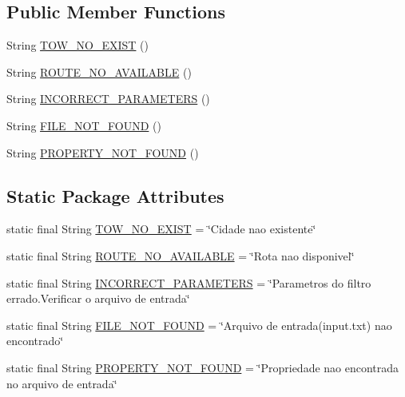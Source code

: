\subsection*{Public Member Functions}
\begin{DoxyCompactItemize}
\item 
String \hyperlink{classtranslate_1_1_pt_b_r_aa32cbf8602c41b8c6d61f19bc6c167dc}{T\+O\+W\+\_\+\+N\+O\+\_\+\+E\+X\+I\+ST} ()
\item 
String \hyperlink{classtranslate_1_1_pt_b_r_a218e01c1590aa220f2c260639080cca2}{R\+O\+U\+T\+E\+\_\+\+N\+O\+\_\+\+A\+V\+A\+I\+L\+A\+B\+LE} ()
\item 
String \hyperlink{classtranslate_1_1_pt_b_r_adaf7225439d23bc30ffd45644c9142b8}{I\+N\+C\+O\+R\+R\+E\+C\+T\+\_\+\+P\+A\+R\+A\+M\+E\+T\+E\+RS} ()
\item 
String \hyperlink{classtranslate_1_1_pt_b_r_a85f5cfc4ae5d12f192f3e513c7666455}{F\+I\+L\+E\+\_\+\+N\+O\+T\+\_\+\+F\+O\+U\+ND} ()
\item 
String \hyperlink{classtranslate_1_1_pt_b_r_aa9cef0ea9eb36d51a17532a6c216e6bd}{P\+R\+O\+P\+E\+R\+T\+Y\+\_\+\+N\+O\+T\+\_\+\+F\+O\+U\+ND} ()
\end{DoxyCompactItemize}
\subsection*{Static Package Attributes}
\begin{DoxyCompactItemize}
\item 
static final String \hyperlink{classtranslate_1_1_pt_b_r_a3e6e08c00ceaca45f895e44dfa6cbec7}{T\+O\+W\+\_\+\+N\+O\+\_\+\+E\+X\+I\+ST} = \char`\"{}Cidade nao existente\char`\"{}
\item 
static final String \hyperlink{classtranslate_1_1_pt_b_r_a2fe240464f6f622d04e4a439cb6d22a5}{R\+O\+U\+T\+E\+\_\+\+N\+O\+\_\+\+A\+V\+A\+I\+L\+A\+B\+LE} = \char`\"{}Rota nao disponivel\char`\"{}
\item 
static final String \hyperlink{classtranslate_1_1_pt_b_r_a6cbfffab3a0a67312e6ebc05ca778cd6}{I\+N\+C\+O\+R\+R\+E\+C\+T\+\_\+\+P\+A\+R\+A\+M\+E\+T\+E\+RS} = \char`\"{}Parametros do filtro errado.\+Verificar o arquivo de entrada\char`\"{}
\item 
static final String \hyperlink{classtranslate_1_1_pt_b_r_ab8ea17cdc7f78b0204c09761a392b8ba}{F\+I\+L\+E\+\_\+\+N\+O\+T\+\_\+\+F\+O\+U\+ND} = \char`\"{}Arquivo de entrada(input.\+txt) nao encontrado\char`\"{}
\item 
static final String \hyperlink{classtranslate_1_1_pt_b_r_ae62aea783a824f3e5560dde779e5b2b7}{P\+R\+O\+P\+E\+R\+T\+Y\+\_\+\+N\+O\+T\+\_\+\+F\+O\+U\+ND} = \char`\"{}Propriedade nao encontrada no arquivo de entrada\char`\"{}
\end{DoxyCompactItemize}


